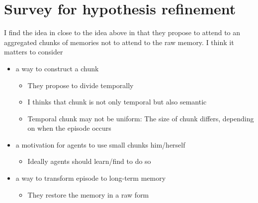 \documentclass[12pt]{article}
\begin{document}
\section{Survey for hypothesis refinement}
I find the idea in \cite{Lampinen21} close to the idea above in that they propose to attend to an aggregated 
chunks of memories not to attend to the raw memory. I think it matters to consider
\begin{itemize}
    \item a way to construct a chunk
    \begin{itemize}
        \item They propose to divide temporally
        \item I thinks that chunk is not only temporal but also semantic
        \item Temporal chunk may not be uniform: The size of chunk differs,
        depending on when the episode occurs
    \end{itemize}
    \item a motivation for agents to use small chunks him/herself
    \begin{itemize}
        \item Ideally agents should learn/find to do so
    \end{itemize}
    \item a way to transform episode to long-term memory
    \begin{itemize}
        \item They restore the memory in a raw form
    \end{itemize}    
\end{itemize}



\end{document}
